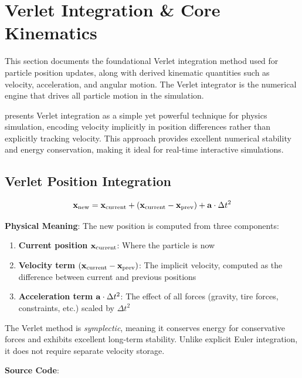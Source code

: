 \section{Verlet Integration \& Core Kinematics}

This section documents the foundational Verlet integration method used for particle position updates, along with derived kinematic quantities such as velocity, acceleration, and angular motion. The Verlet integrator is the numerical engine that drives all particle motion in the simulation.

\cite{jakobsen2001advanced} presents Verlet integration as a simple yet powerful technique for physics simulation, encoding velocity implicitly in position differences rather than explicitly tracking velocity. This approach provides excellent numerical stability and energy conservation, making it ideal for real-time interactive simulations.

\subsection{Verlet Position Integration}

\begin{equation}
  \mathbf{x}_{\text{new}} = \mathbf{x}_{\text{current}} + (\mathbf{x}_{\text{current}} - \mathbf{x}_{\text{prev}}) + \mathbf{a} \cdot \Delta t^2
  \label{eq:verlet-position}
\end{equation}

\textbf{Physical Meaning}: The new position is computed from three components:
\begin{enumerate}
  \item \textbf{Current position} $\mathbf{x}_{\text{current}}$: Where the particle is now
  \item \textbf{Velocity term} $(\mathbf{x}_{\text{current}} - \mathbf{x}_{\text{prev}})$: The implicit velocity, computed as the difference between current and previous positions
  \item \textbf{Acceleration term} $\mathbf{a} \cdot \Delta t^2$: The effect of all forces (gravity, tire forces, constraints, etc.) scaled by $\Delta t^2$
\end{enumerate}

The Verlet method is \textit{symplectic}, meaning it conserves energy for conservative forces and exhibits excellent long-term stability. Unlike explicit Euler integration, it does not require separate velocity storage.

\textbf{Source Code}: 

